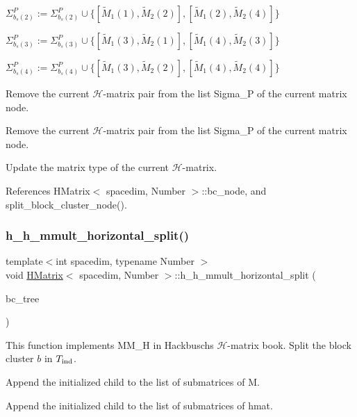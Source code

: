 $\Sigma_{b_s(2)}^P := \Sigma_{b_s(2)}^P \cup \{[\tilde{M}_1(1), \tilde{M}_2(2)], [\tilde{M}_1(2), \tilde{M}_2(4)]\}$

$\Sigma_{b_s(3)}^P := \Sigma_{b_s(3)}^P \cup \{[\tilde{M}_1(3), \tilde{M}_2(1)], [\tilde{M}_1(4), \tilde{M}_2(3)]\}$

$\Sigma_{b_s(4)}^P := \Sigma_{b_s(4)}^P \cup \{[\tilde{M}_1(3), \tilde{M}_2(2)], [\tilde{M}_1(4), \tilde{M}_2(4)]\}$

Remove the current $\mathcal{H}$-\/matrix pair from the list {\ttfamily Sigma\+\_\+P} of the current matrix node.

Remove the current $\mathcal{H}$-\/matrix pair from the list {\ttfamily Sigma\+\_\+P} of the current matrix node.

Update the matrix type of the current $\mathcal{H}$-\/matrix.

References H\+Matrix$<$ spacedim, Number $>$\+::bc\+\_\+node, and split\+\_\+block\+\_\+cluster\+\_\+node().

\mbox{\label{classHMatrix_a38c88893c6ca784d4e56653d8b0e3e67}} 
\subsubsection{\texorpdfstring{h\+\_\+h\+\_\+mmult\+\_\+horizontal\+\_\+split()}{h\_h\_mmult\_horizontal\_split()}}
{\footnotesize\ttfamily template$<$int spacedim, typename Number $>$ \\
void \hyperlink{classHMatrix}{H\+Matrix}$<$ spacedim, Number $>$\+::h\+\_\+h\+\_\+mmult\+\_\+horizontal\+\_\+split (\begin{DoxyParamCaption}\item[{\hyperlink{classBlockClusterTree}{Block\+Cluster\+Tree}$<$ spacedim, Number $>$ \&}]{bc\+\_\+tree }\end{DoxyParamCaption})}

This function implements {\ttfamily M\+M\+\_\+H} in Hackbusch\textquotesingle{}s $\mathcal{H}$-\/matrix book. Split the block cluster $b$ in $T_{\rm ind}$.

Append the initialized child to the list of submatrices of {\ttfamily M}.

Append the initialized child to the list of submatrices of {\ttfamily hmat}.

